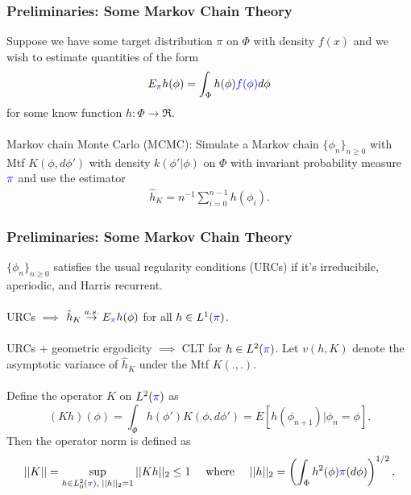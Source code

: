 \documentclass[xcolor=dvipsnames]{beamer}
\begin{document}
\begin{frame}
\frametitle{Preliminaries: Some Markov Chain Theory}
Suppose we have some target distribution {\color{blue} $\pi$} on $\Phi$ with density {\color{blue} $f(x)$} and we wish to estimate quantities of the form 
\begin{align*}
E_{\color{blue}\pi} h(\phi) = \int_{\Phi} h(\phi){\color{blue}f(\phi)}d\phi
\end{align*}
for some know function $h:\Phi\to\Re$.\\~\\

\pause Markov chain Monte Carlo (MCMC): Simulate a Markov chain $\{\phi_n\}_{n\geq 0}$ with Mtf $K(\phi,d\phi')$ with density $k(\phi'|\phi)$ on $\Phi$ with invariant probability measure ${\color{blue}\pi}$ and use the estimator
\begin{align*}
\hat{h}_K=n^{-1}\sum_{i=0}^{n-1}h(\phi_i).
\end{align*}
\end{frame}

\begin{frame}
\frametitle{Preliminaries: Some Markov Chain Theory}
$\{\phi_n\}_{n\geq 0}$ satisfies the usual regularity conditions (URCs) if it's irreducibile, aperiodic, and Harris recurrent. \\~\\

\pause URCs $\implies$ $\hat{h}_K \stackrel{a.s.}{\to} E_{\color{blue}\pi}h(\phi)$ for all $h\in L^1({\color{blue}\pi})$.\\~\\
URCs + geometric ergodicity $\implies$ CLT for $h\in L^2({\color{blue}\pi})$. Let $v(h,K)$ denote the asymptotic variance of $\hat{h}_K$ under the Mtf $K(.,.)$.\\~\\

\pause Define the operator $K$ on $L^2({\color{blue}\pi})$ as 
\[
(Kh)(\phi)=\int_{\Phi}h(\phi')K(\phi,d\phi')=E[h(\phi_{n+1})|\phi_n=\phi].
\]
Then the operator norm is defined as
\begin{align*}
||K||=\sup_{h\in L^2_0({\color{blue}\pi}),\; ||h||_2=1}||Kh||_2 \leq 1 && \mbox{ where } && ||h||_2=\left(\int_{\Phi}h^2(\phi){\color{blue}\pi}(d\phi)\right)^{1/2}.
\end{align*}
\end{frame}
\end{document}

